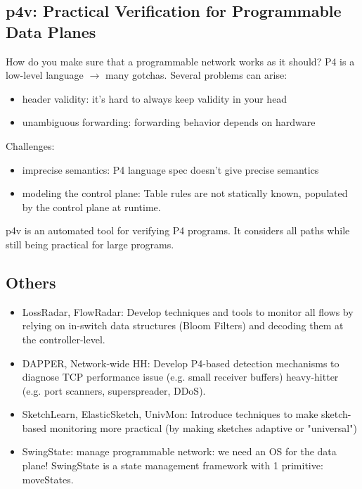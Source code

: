 \documentclass[11pt,oneside,a4paper]{article}
\begin{document}
\subsection{p4v: Practical Verification for Programmable Data Planes}

How do you make sure that a programmable network works as it should? P4 is a low-level language $\rightarrow$ many gotchas. Several problems can arise:

\vspace{-\topsep}
\begin{itemize}
	\setlength{\itemsep}{0pt}
	\setlength{\parskip}{0pt}
	\item header validity: it's hard to always keep validity in your head
	\item unambiguous forwarding: forwarding behavior depends on hardware
\end{itemize}
\vspace{-\topsep}

\noindent Challenges:

\vspace{-\topsep}
\begin{itemize}
	\setlength{\itemsep}{0pt}
	\setlength{\parskip}{0pt}
	\item imprecise semantics: P4 language spec doesn't give precise semantics
	\item modeling the control plane: Table rules are not statically known, populated by the control plane at runtime.
\end{itemize}
\vspace{-\topsep}

\noindent p4v \cite{p4v} is an automated tool for verifying P4 programs. It considers all paths while still being practical for large programs.

\subsection{Others}

\vspace{-\topsep}
\begin{itemize}
	\setlength{\itemsep}{0pt}
	\setlength{\parskip}{0pt}
	\item LossRadar, FlowRadar: Develop techniques and tools to monitor all flows by relying on in-switch data structures (Bloom Filters) and decoding them at the controller-level.
	\item DAPPER, Network-wide HH: Develop P4-based detection mechanisms to diagnose TCP performance issue (e.g. small receiver buffers)	heavy-hitter (e.g. port scanners, superspreader, DDoS).
	\item SketchLearn, ElasticSketch, UnivMon: Introduce techniques to make sketch-based monitoring
	more practical (by making sketches adaptive or "universal")
	\item SwingState: manage programmable network: we need an OS for the data plane! SwingState is a state management framework with 1 primitive: moveStates.
\end{itemize}
\vspace{-\topsep}
\end{document}
